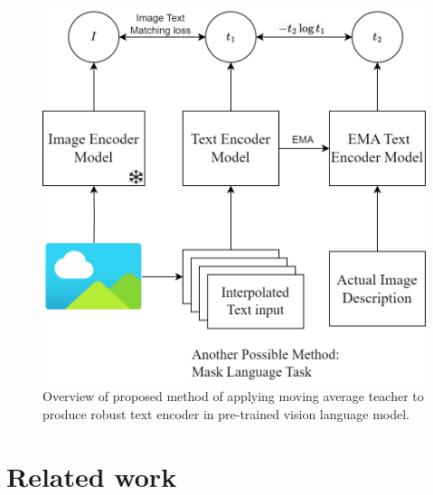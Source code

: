\documentclass[10pt,twocolumn,letterpaper]{article}
\begin{document}
\begin{figure}[h]
   \label{fig:overall_method}
   \begin{center}
      \includegraphics[width=0.8\linewidth]{Images/ThesisDiagram.png}
   \end{center}
   \caption{Overview of proposed method of applying moving average teacher to produce robust text encoder in pre-trained vision language model.}
   \small
\end{figure}


\section{Related work}
\end{document}
